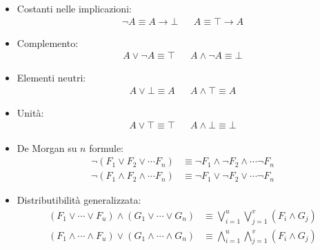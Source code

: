 \begin{itemize}
  \item Costanti nelle implicazioni:
    \begin{align*}
      \neg A \equiv A \rightarrow \bot &&
      A \equiv \top \rightarrow A 
    \end{align*}
  
  \item Complemento:
    \begin{align*}
      A \lor \neg A \equiv \top &&
      A \land \neg A \equiv \bot
    \end{align*}
    
  \item Elementi neutri:
    \begin{align*}
      A \lor \bot \equiv A &&
      A \land \top \equiv A
    \end{align*}
      
  \item Unità:
    \begin{align*}
      A \lor \top  \equiv\top &&
      A \land \bot \equiv \bot
    \end{align*}
    
  \item De Morgan su $n$ formule:
    \begin{align*}
      \neg (F_1 \lor F_2 \lor \cdots F_n) & \equiv \neg F_1 \land \neg F_2 \land \cdots \neg F_n\\
      \neg (F_1 \land F_2 \land \cdots F_n) & \equiv \neg F_1 \lor \neg F_2  \lor \cdots \neg F_n
    \end{align*}
  
  \item  Distributibilità generalizzata:
  \label {def:distributibilita-generalizzata}
    \begin{align*}
      (F_1 \lor \cdots \lor F_u) \land (G_1 \lor \cdots \lor G_n) & \equiv \bigvee\limits_{i = 1}^{u} \bigvee\limits_{j = 1}^{v} (F_i \land G_j) \\
      (F_1 \land \cdots \land F_u) \lor (G_1 \land \cdots \land G_n) & \equiv \bigwedge\limits_{i = 1}^{u} \bigwedge\limits_{j = 1}^{v} (F_i \land G_j)
    \end{align*}

\end{itemize}

